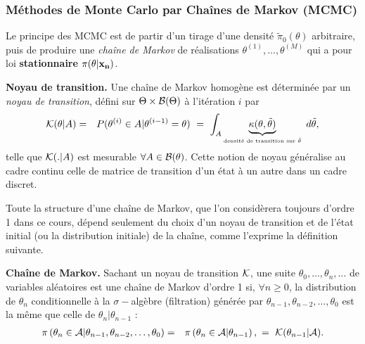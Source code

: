 \if{} \vspace{1cm} 
\fi









\subsubsection{Méthodes de Monte Carlo par Chaînes de Markov (MCMC)}\label{MCMC}

Le principe des MCMC est de partir d'un tirage d'une densité $\tilde{\pi}_0(\theta)$ arbitraire, puis de 
produire une \emph{chaîne de Markov} de réalisations $\theta^{(1)},\ldots,\theta^{(M)}$ qui a pour loi
{\bf stationnaire} $\pi(\theta|{\bf x_n})$. \\ %

\begin{definition}{\bf Noyau de transition.}
Une chaîne de Markov homogène est déterminée par un \emph{noyau de transition}, défini sur $\Theta\times {\cal{B}}(\Theta)$ à l'itération $i$ par 
\begin{eqnarray*}
{\cal{K}}(\theta|A) & = & P(\theta^{(i)}\in A | \theta^{(i-1)}=\theta) \ = \ \int_{A} \underbrace{{\kappa}(\theta,\tilde{\theta})}_{\text{\tiny densité de transition sur $\tilde{\theta}$}} \ d\tilde{\theta},
\end{eqnarray*} 
telle que ${\cal{K}}(.|A)$ est mesurable $\forall A \in {\cal{B}}(\theta)$. Cette notion de noyau généralise au cadre continu celle de matrice de transition d'un état à un autre dans un cadre discret. 
\end{definition}

\noindent Toute la structure d'une chaîne de Markov, que l'on considèrera toujours d'ordre 1 dans ce cours, dépend seulement du choix d'un noyau de transition et de l'état initial (ou la distribution initiale) de la chaîne, comme l'exprime la définition suivante. 

\begin{definition}{\bf Chaîne de Markov.}
 Sachant un noyau de transition ${\cal{K}}$, une suite $\theta_0,\ldots,\theta_n,\ldots$ de variables aléatoires est une chaîne de Markov d'ordre 1 si, $\forall n\geq 0$, la distribution de $\theta_n$ conditionnelle à la $\sigma-$algèbre (filtration) générée par $\theta_{n-1},\theta_{n-2},\ldots,\theta_0$ est la même que celle de $\theta_{n}|\theta_{n-1}$ :
 \begin{eqnarray*}
 \pi\left(\theta_n\in {\cal{A}} | \theta_{n-1},\theta_{n-2},\ldots,\theta_0\right) & = & \pi\left(\theta_n\in {\cal{A}} | \theta_{n-1}\right), \ 
 = \  {\cal{K}}(\theta_{n-1}|{\cal{A}}).
 \end{eqnarray*}
\end{definition}


